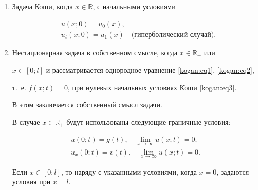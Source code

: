 \begin{enumerate}

\item[1.] Задача Коши, когда $x\in \mathbb R$, с начальными условиями

\begin{equation}

\label{kogan:eq3}

\begin{aligned}

& u(x;0)=u_0 (x), \\

& u_t (x;0)=u_1 (x) \quad \text{(гиперболический случай)}. 

\end{aligned} 

\end{equation}



\item[2.] Нестационарная задача в собственном смысле, когда $x \! \in \! \mathbb R_+$ или 

${x \! \in \! [0; l]}$ и рассматривается однородное уравнение \eqref{kogan:eq1}, \eqref{kogan:eq2}, 

т.~е. $f(x;t)=0$, при нулевых начальных условиях Коши \eqref{kogan:eq3}. 

В этом заключается  собственный смысл задачи. 

В случае $x\in \mathbb R_+$ будут использованы следующие  граничные условия: 

\begin{gather}

\label{kogan:eq4}

u(0;t)=g(t),

\quad

\lim \limits_{x\to \infty } u(x;t)=0;\\

\label{kogan:eq5}

u_x (0;t)=v(t),

\quad

\lim \limits_{x\to \infty } u(x;t)=0.

\end{gather}

Если $x\in [0;l]$, то наряду с указанными условиями, когда $x=0$, задаются условия при $x=l$.



\end{enumerate}



